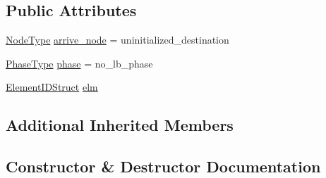 \subsection*{Public Attributes}
\begin{DoxyCompactItemize}
\item 
\hyperlink{namespacevt_a866da9d0efc19c0a1ce79e9e492f47e2}{Node\+Type} \hyperlink{structvt_1_1vrt_1_1collection_1_1balance_1_1_l_b_data_restart_reader_1_1_arrive_msg_a90c862079818906acddd6b334509cf63}{arrive\+\_\+node} = uninitialized\+\_\+destination
\item 
\hyperlink{namespacevt_a46ce6733d5cdbd735d561b7b4029f6d7}{Phase\+Type} \hyperlink{structvt_1_1vrt_1_1collection_1_1balance_1_1_l_b_data_restart_reader_1_1_arrive_msg_ae50ef991dd3d09ab883d14e75c15b44b}{phase} = no\+\_\+lb\+\_\+phase
\item 
\hyperlink{namespacevt_1_1vrt_1_1collection_1_1balance_a9f5b53fafb270212279a4757d2c4cd28}{Element\+I\+D\+Struct} \hyperlink{structvt_1_1vrt_1_1collection_1_1balance_1_1_l_b_data_restart_reader_1_1_arrive_msg_a7a56a9862c000fecdfd71072e93ef071}{elm}
\end{DoxyCompactItemize}
\subsection*{Additional Inherited Members}


\subsection{Constructor \& Destructor Documentation}
\mbox{\label{structvt_1_1vrt_1_1collection_1_1balance_1_1_l_b_data_restart_reader_1_1_arrive_msg_ab83f336b46516e8d1c2915725c86ebc8}} 
